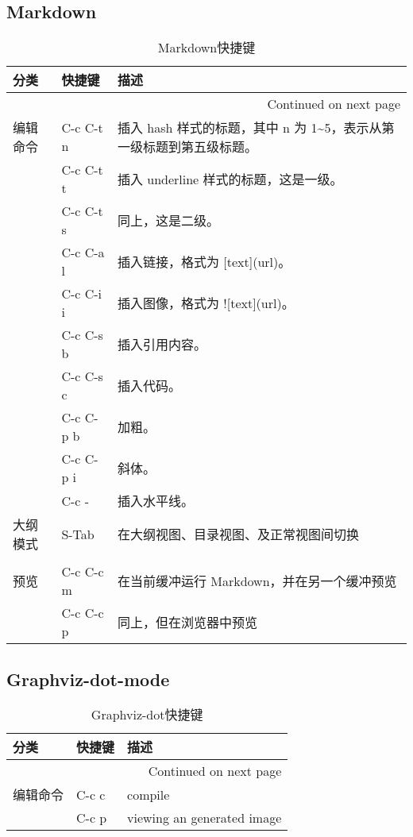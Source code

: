 \documentclass[10pt,a4paper]{article}
\begin{document}
\subsection{Markdown}
\label{sec-3-14}
\begin{longtable}{l|l|l}
\caption{Markdown快捷键}
\\
分类 & 快捷键 & 描述\\
\hline
\endhead
\hline\multicolumn{3}{r}{Continued on next page} \\
\endfoot
\endlastfoot
编辑命令 & C-c C-t n & 插入 hash 样式的标题，其中 n 为 1\textasciitilde{}5，表示从第一级标题到第五级标题。\\
 & C-c C-t t & 插入 underline 样式的标题，这是一级。\\
 & C-c C-t s & 同上，这是二级。\\
 & C-c C-a l & 插入链接，格式为 [text](url)。\\
 & C-c C-i i & 插入图像，格式为 ![text](url)。\\
 & C-c C-s b & 插入引用内容。\\
 & C-c C-s c & 插入代码。\\
 & C-c C-p b & 加粗。\\
 & C-c C-p i & 斜体。\\
 & C-c - & 插入水平线。\\
\hline
大纲模式 & S-Tab & 在大纲视图、目录视图、及正常视图间切换\\
 &  & \\
\hline
预览 & C-c C-c m & 在当前缓冲运行 Markdown，并在另一个缓冲预览\\
 & C-c C-c p & 同上，但在浏览器中预览\\
\end{longtable}

\subsection{Graphviz-dot-mode}
\label{sec-3-15}
\begin{longtable}{l|l|l}
\caption{Graphviz-dot快捷键}
\\
分类 & 快捷键 & 描述\\
\hline
\endhead
\hline\multicolumn{3}{r}{Continued on next page} \\
\endfoot
\endlastfoot
编辑命令 & C-c c & compile\\
 & C-c p & viewing an generated image\\
\end{longtable}
\end{document}
